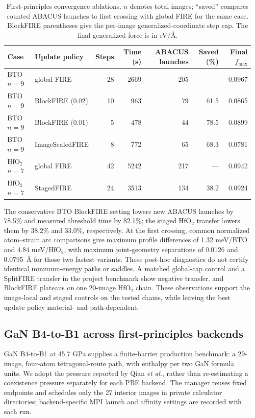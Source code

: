 \documentclass[final,5p,times,twocolumn]{elsarticle}
\begin{document}
\begin{table}[t]
\centering
\footnotesize
\caption{First-principles convergence ablations. $n$ denotes total images;
``saved'' compares counted ABACUS launches to first crossing with global FIRE for the same case.
BlockFIRE parentheses give the per-image generalized-coordinate step cap.
The final generalized force is in eV/\AA{}.}
\label{tab:acceleration}
\begin{tabular}{@{}llrrrrr@{}}
\toprule
Case & Update policy & Steps & Time (s) & ABACUS launches & Saved (\%) & Final $f_{\max}$ \\
\midrule
BTO $n=9$ & global FIRE & 28 & 2669 & 205 & --- & 0.0967 \\
BTO $n=9$ & BlockFIRE (0.02) & 10 & 963 & 79 & 61.5 & 0.0865 \\
BTO $n=9$ & BlockFIRE (0.01) & 5 & 478 & 44 & 78.5 & 0.0899 \\
BTO $n=9$ & ImageScaledFIRE & 8 & 772 & 65 & 68.3 & 0.0781 \\
HfO$_2$ $n=7$ & global FIRE & 42 & 5242 & 217 & --- & 0.0942 \\
HfO$_2$ $n=7$ & StagedFIRE & 24 & 3513 & 134 & 38.2 & 0.0924 \\
\bottomrule
\end{tabular}
\end{table}

The conservative BTO BlockFIRE setting lowers new ABACUS launches by
78.5\% and measured threshold time by 82.1\%; the staged HfO$_2$ transfer
lowers them by 38.2\% and 33.0\%, respectively. At the first crossing,
common normalized atom--strain arc comparisons give maximum profile
differences of 1.32 meV/BTO and 4.84 meV/HfO$_2$, with maximum joint-geometry
separations of 0.0126 and 0.0795~\AA{} for those two fastest variants. These
post-hoc diagnostics do not certify identical minimum-energy paths or saddles.
A matched global-cap control
and a SplitFIRE transfer in the project benchmark show negative transfer, and
BlockFIRE plateaus on one 20-image HfO$_2$ chain. These observations support
the image-local and staged controls on the tested chains, while leaving the
best update policy material- and path-dependent.

\subsection{GaN B4-to-B1 across first-principles backends}
\label{sec:gan-multibackend}

GaN B4-to-B1 at 45.7 GPa supplies a finite-barrier production benchmark: a
29-image, four-atom tetragonal-route path, with enthalpy per two GaN formula
units. We adopt the pressure reported by Qian
\emph{et al.}, rather than re-estimating a coexistence pressure separately for
each PBE backend. The manager reuses fixed endpoints and schedules only
the 27 interior images in private calculator directories; backend-specific
MPI launch and affinity settings are recorded with each run.
\end{document}
